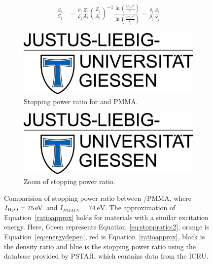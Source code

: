 \documentclass{article}
\begin{document}
\begin{align}
\label{ratioapprox}
    \frac{S_i}{S_j} &=\frac{\rho_i}{\rho_j}\frac{Z_i}{A_i}\left(\frac{Z_j}{A_j}\right)^{-1}\frac{\ln\left(\frac{2m_ec^2}{I_i}\right)}{\ln\left(\frac{2m_ec^2}{I_j}\right)} = \frac{\rho_i}{\rho_j}\frac{\hat{S}_i}{\hat{S}_j}
\end{align}


\begin{figure}[ht]
    \centering
    \begin{subfigure}[t]{0.43\textwidth}
        \centering
        \includegraphics[width=\textwidth]{fig/jlu.png}
        \caption{Stopping power ratio for  and PMMA.}
        \label{fig:approx:pmma:1}
    \end{subfigure}
    \hfill
    \begin{subfigure}[t]{0.43\textwidth}
        \centering
        \includegraphics[width=\textwidth]{fig/jlu.png}
        \caption{Zoom of stopping power ratio.}
        \label{fig:approx:pmma:2}
    \end{subfigure}
    \caption{Comparision of stopping power ratio between /PMMA, where $I_{\ce{H2O}}=\SI{75}{\electronvolt}$ and $I_{PMMA}=\SI{74}{\electronvolt}$. The approximation of Equation~\ref{ratioapprox} holds for materials with a similar excitation energy. Here, Green represents Equation~\ref{eq:stoppratio:2}, orange is Equation~\ref{eq:energydepen}, red is Equation~\ref{ratioapprox}, black is the density ratio and blue is the stopping power ratio using the database provided by PSTAR, which contains data from the ICRU.}
    \label{fig:approx:pmma}
\end{figure}
\end{document}
